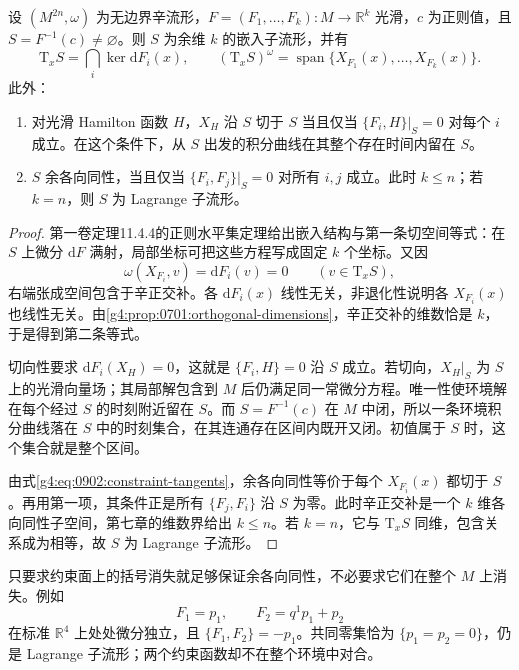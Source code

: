 \begin{proposition}\label{g4:prop:0902:regular-constraints}
	设 \((M^{2n},\omega)\) 为无边界辛流形，\(F=(F_1,\ldots,F_k):M\to\mathbb R^k\) 光滑，\(c\) 为正则值，且 \(S=F^{-1}(c)\ne\varnothing\)。则 \(S\) 为余维 \(k\) 的嵌入子流形，并有
	\begin{equation}\label{g4:eq:0902:constraint-tangents}
		\mathrm{T}_xS=\bigcap_i\ker\mathrm{d}F_i(x),
		\qquad
		(\mathrm{T}_xS)^\omega
		=\operatorname{span}\{X_{F_1}(x),\ldots,X_{F_k}(x)\}.
	\end{equation}
	此外：
	\begin{enumerate}
		\item 对光滑 Hamilton 函数 \(H\)，\(X_H\) 沿 \(S\) 切于 \(S\) 当且仅当 \(\{F_i,H\}|_S=0\) 对每个 \(i\) 成立。在这个条件下，从 \(S\) 出发的积分曲线在其整个存在时间内留在 \(S\)。
		\item \(S\) 余各向同性，当且仅当 \(\{F_i,F_j\}|_S=0\) 对所有 \(i,j\) 成立。此时 \(k\le n\)；若 \(k=n\)，则 \(S\) 为 Lagrange 子流形。
	\end{enumerate}
\end{proposition}
\begin{proof}
	第一卷定理11.4.4的正则水平集定理给出嵌入结构与第一条切空间等式：在 \(S\) 上微分 \(\mathrm{d}F\) 满射，局部坐标可把这些方程写成固定 \(k\) 个坐标。又因
	\[
		\omega(X_{F_i},v)=\mathrm{d}F_i(v)=0
		\qquad(v\in\mathrm{T}_xS),
	\]
	右端张成空间包含于辛正交补。各 \(\mathrm{d}F_i(x)\) 线性无关，非退化性说明各 \(X_{F_i}(x)\) 也线性无关。由\cref{g4:prop:0701:orthogonal-dimensions}，辛正交补的维数恰是 \(k\)，于是得到第二条等式。

	切向性要求 \(\mathrm{d}F_i(X_H)=0\)，这就是 \(\{F_i,H\}=0\) 沿 \(S\) 成立。若切向，\(X_H|_S\) 为 \(S\) 上的光滑向量场；其局部解包含到 \(M\) 后仍满足同一常微分方程。唯一性使环境解在每个经过 \(S\) 的时刻附近留在 \(S\)。而 \(S=F^{-1}(c)\) 在 \(M\) 中闭，所以一条环境积分曲线落在 \(S\) 中的时刻集合，在其连通存在区间内既开又闭。初值属于 \(S\) 时，这个集合就是整个区间。

	由式\eqref{g4:eq:0902:constraint-tangents}，余各向同性等价于每个 \(X_{F_i}(x)\) 都切于 \(S\)。再用第一项，其条件正是所有 \(\{F_j,F_i\}\) 沿 \(S\) 为零。此时辛正交补是一个 \(k\) 维各向同性子空间，第七章的维数界给出 \(k\le n\)。若 \(k=n\)，它与 \(\mathrm{T}_xS\) 同维，包含关系成为相等，故 \(S\) 为 Lagrange 子流形。
\end{proof}

只要求约束面上的括号消失就足够保证余各向同性，不必要求它们在整个 \(M\) 上消失。例如
\[
	F_1=p_1,\qquad F_2=q^1p_1+p_2
\]
在标准 \(\mathbb R^4\) 上处处微分独立，且 \(\{F_1,F_2\}=-p_1\)。共同零集恰为 \(\{p_1=p_2=0\}\)，仍是 Lagrange 子流形；两个约束函数却不在整个环境中对合。

